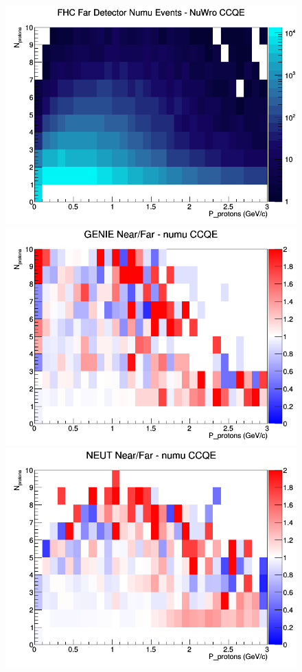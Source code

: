 \begin{figure}[h]
\endminipage
{}
\includegraphics[width=\linewidth]{N_P/nominal/protons/CCQE_FHC_FD_numu_N_P_NuWro.png}
\endminipage
\newline
{}
\includegraphics[width=\linewidth]{N_P/nominal/protons/ratios/CCQE_GENIE_numu_NF_N_P.png}
\endminipage
{}
\includegraphics[width=\linewidth]{N_P/nominal/protons/ratios/CCQE_NEUT_numu_NF_N_P.png}

\end{figure}
